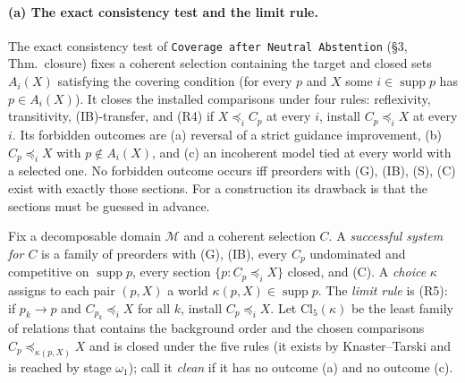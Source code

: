 \documentclass[11pt]{article}
\theoremstyle{definition}
\theoremstyle{remark}
\newcommand{\M}{\mathcal M}
\newcommand{\supp}{\operatorname{supp}}
\newcommand{\src}[1]{\texttt{#1}}
\begin{document}
\paragraph{(a) The exact consistency test and the limit rule.} The exact consistency test of \src{Coverage after Neutral Abstention} (\S3, Thm.~closure) fixes a coherent selection containing the target and closed sets $A_i(X)$ satisfying the covering condition (for every $p$ and $X$ some $i\in\supp p$ has $p\in A_i(X)$). It closes the installed comparisons under four rules: reflexivity, transitivity, (IB)-transfer, and (R4) if $X\preceq_iC_p$ at every $i$, install $C_p\preceq_iX$ at every $i$. Its forbidden outcomes are (a) reversal of a strict guidance improvement, (b) $C_p\preceq_iX$ with $p\notin A_i(X)$, and (c) an incoherent model tied at every world with a selected one. No forbidden outcome occurs iff preorders with (G), (IB), (S), (C) exist with exactly those sections. For a construction its drawback is that the sections must be guessed in advance.

Fix a decomposable domain $\M$ and a coherent selection $C$. A \emph{successful system for $C$} is a family of preorders with (G), (IB), every $C_p$ undominated and competitive on $\supp p$, every section $\{p:C_p\preceq_iX\}$ closed, and (C). A \emph{choice} $\kappa$ assigns to each pair $(p,X)$ a world $\kappa(p,X)\in\supp p$. The \emph{limit rule} is (R5): if $p_k\to p$ and $C_{p_k}\preceq_iX$ for all $k$, install $C_p\preceq_iX$. Let $\mathrm{Cl}_5(\kappa)$ be the least family of relations that contains the background order and the chosen comparisons $C_p\preceq_{\kappa(p,X)}X$ and is closed under the five rules (it exists by Knaster--Tarski and is reached by stage $\omega_1$); call it \emph{clean} if it has no outcome (a) and no outcome (c).
\end{document}
